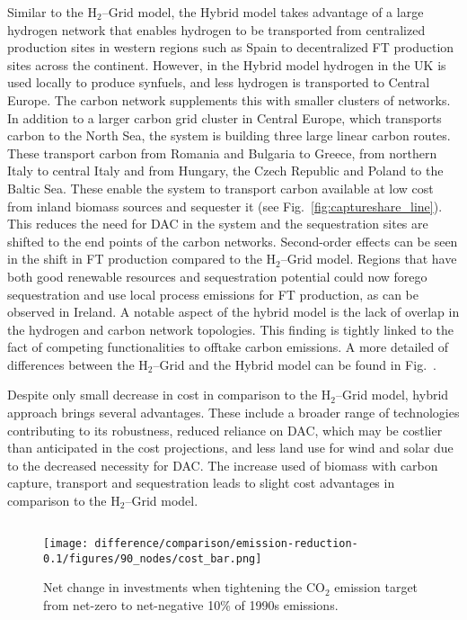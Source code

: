 \documentclass[twocolumn]{article}
\newcommand{\carbon}{CO$_2$}
\newcommand{\hydrogen}{H$_2$}
\newcommand{\hydrogengrid}{\hydrogen{}--Grid}
\begin{document}
Similar to the \hydrogengrid{} model, the Hybrid model takes advantage of a large hydrogen network that enables hydrogen to be transported from centralized production sites in western regions such as Spain to decentralized FT production sites across the continent. However, in the Hybrid model hydrogen in the UK is used locally to produce synfuels, and less hydrogen is transported to Central Europe.
The carbon network supplements this with smaller clusters of networks. In addition to a larger carbon grid cluster in Central Europe, which transports carbon to the North Sea, the system is building three large linear carbon routes. These transport carbon from Romania and Bulgaria to Greece, from northern Italy to central Italy and from Hungary, the Czech Republic and Poland to the Baltic Sea. These enable the system to transport carbon available at low cost from inland biomass sources and sequester it (see Fig.~\ref{fig:captureshare_line}). This reduces the need for DAC in the system and the sequestration sites are shifted to the end points of the carbon networks. Second-order effects can be seen in the shift in FT production compared to the \hydrogengrid{} model. Regions that have both good renewable resources and sequestration potential could now forego sequestration and use local process emissions for FT production, as can be observed in Ireland. A notable aspect of the hybrid model is the lack of overlap in the hydrogen and carbon network topologies. This finding is tightly linked to the fact of competing functionalities to offtake carbon emissions.
A more detailed of differences between the \hydrogengrid{} and the Hybrid model can be found in Fig.~.


Despite only small decrease in cost in comparison to the \hydrogengrid{} model, hybrid approach brings several advantages. These include a broader range of technologies contributing to its robustness, reduced reliance on DAC, which may be costlier than anticipated in the cost projections, and less land use for wind and solar due to the decreased necessity for DAC. The increase used of biomass with carbon capture, transport and sequestration leads to slight cost advantages in comparison to the \hydrogengrid{} model.



\subsection*{}

\begin{figure}[htb!]
    \centering
    \texttt{[image: difference/comparison/emission-reduction-0.1/figures/90\_nodes/cost\_bar.png]}
    \caption[short]{Net change in investments when tightening the \carbon{} emission target from net-zero to net-negative 10\% of 1990s emissions.}
    \label{fig:net-negative_cost_bar}
\end{figure}
\end{document}
